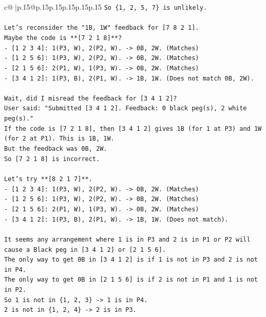 \documentclass{article}
\begin{document}
{\begin{supertabular}{c@{$\;$}|p{.15\linewidth}@{}p{.15\linewidth}p{.15\linewidth}p{.15\linewidth}p{.15\linewidth}p{.15\linewidth}}
{{{\texttt{So \{1, 2, 5, 7\} is unlikely.} \\
\\ 
\texttt{Let's reconsider the "1B, 1W" feedback for {[}7 8 2 1{]}.} \\
\texttt{Maybe the code is **{[}7 2 1 8{]}**?} \\
\texttt{{-} {[}1 2 3 4{]}: 1(P3, W), 2(P2, W). {-}> 0B, 2W. (Matches)} \\
\texttt{{-} {[}1 2 5 6{]}: 1(P3, W), 2(P2, W). {-}> 0B, 2W. (Matches)} \\
\texttt{{-} {[}2 1 5 6{]}: 2(P1, W), 1(P3, W). {-}> 0B, 2W. (Matches)} \\
\texttt{{-} {[}3 4 1 2{]}: 1(P3, B), 2(P1, W). {-}> 1B, 1W. (Does not match 0B, 2W).} \\
\\ 
\texttt{Wait, did I misread the feedback for {[}3 4 1 2{]}?} \\
\texttt{User said: "Submitted {[}3 4 1 2{]}. Feedback: 0 black peg(s), 2 white peg(s)."} \\
\texttt{If the code is {[}7 2 1 8{]}, then {[}3 4 1 2{]} gives 1B (for 1 at P3) and 1W (for 2 at P1). This is 1B, 1W.} \\
\texttt{But the feedback was 0B, 2W.} \\
\texttt{So {[}7 2 1 8{]} is incorrect.} \\
\\ 
\texttt{Let's try **{[}8 2 1 7{]}**.} \\
\texttt{{-} {[}1 2 3 4{]}: 1(P3, W), 2(P2, W). {-}> 0B, 2W. (Matches)} \\
\texttt{{-} {[}1 2 5 6{]}: 1(P3, W), 2(P2, W). {-}> 0B, 2W. (Matches)} \\
\texttt{{-} {[}2 1 5 6{]}: 2(P1, W), 1(P3, W). {-}> 0B, 2W. (Matches)} \\
\texttt{{-} {[}3 4 1 2{]}: 1(P3, B), 2(P1, W). {-}> 1B, 1W. (Does not match).} \\
\\ 
\texttt{It seems any arrangement where 1 is in P3 and 2 is in P1 or P2 will cause a Black peg in {[}3 4 1 2{]} or {[}2 1 5 6{]}.} \\
\texttt{The only way to get 0B in {[}3 4 1 2{]} is if 1 is not in P3 and 2 is not in P4.} \\
\texttt{The only way to get 0B in {[}2 1 5 6{]} is if 2 is not in P1 and 1 is not in P2.} \\
\texttt{So 1 is not in \{1, 2, 3\} {-}> 1 is in P4.} \\
\texttt{2 is not in \{1, 2, 4\} {-}> 2 is in P3.} \\
}}}
\end{supertabular}}
\end{document}
